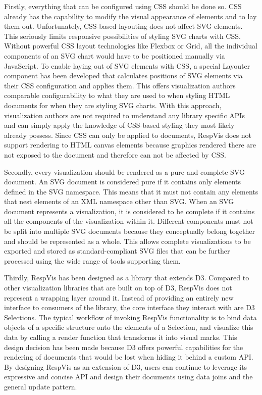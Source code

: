Firstly, everything that can be configured using CSS should be done so.
CSS already has the capability to modify the visual appearance of elements and to lay them out.
Unfortunately, CSS-based layouting does not affect SVG elements.
This seriously limits responsive possibilities of styling SVG charts with CSS.
Without powerful CSS layout technologies like Flexbox or Grid, all the individual components of an SVG chart would have to be positioned manually via JavaScript.
To enable laying out of SVG elements with CSS, a special Layouter component has been developed that calculates positions of SVG elements via their CSS configuration and applies them.
This offers visualization authors comparable configurability to what they are used to when styling HTML documents for when they are styling SVG charts.
With this approach, visualization authors are not required to understand any library specific APIs and can simply apply the knowledge of CSS-based styling they most likely already possess.
Since CSS can only be applied to documents, RespVis does not support rendering to HTML canvas elements because graphics rendered there are not exposed to the document and therefore can not be affected by CSS.

Secondly, every visualization should be rendered as a pure and complete SVG document.
An SVG document is considered pure if it contains only elements defined in the SVG namespace.
This means that it must not contain any  elements that nest elements of an XML namespace other than SVG.
When an SVG document represents a visualization, it is considered to be complete if it contains all the components of the visualization within it.
Different components must not be split into multiple SVG documents because they conceptually belong together and should be represented as a whole.
This allows complete visualizations to be exported and stored as standard-compliant SVG files that can be further processed using the wide range of tools supporting them.

Thirdly, RespVis has been designed as a library that extends D3.
Compared to other visualization libraries that are built on top of D3, RespVis does not represent a wrapping layer around it. 
Instead of providing an entirely new interface to consumers of the library, the core interface they interact with are D3 Selections.
The typical workflow of invoking RespVis functionality is to bind data objects of a specific structure onto the elements of a Selection, and visualize this data by calling a render function that transforms it into visual marks.
This design decision has been made because D3 offers powerful capabilities for the rendering of documents that would be lost when hiding it behind a custom API.
By designing RespVis as an extension of D3, users can continue to leverage its expressive and concise API and design their documents using data joins and the general update pattern.

